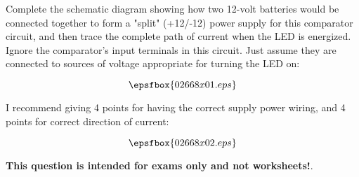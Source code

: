 

Complete the schematic diagram showing how two 12-volt batteries would be connected together to form a "split" (+12/-12) power supply for this comparator circuit, and then trace the complete path of current when the LED is energized.  Ignore the comparator's input terminals in this circuit.  Just assume they are connected to sources of voltage appropriate for turning the LED on:

\vskip 30pt

$$\epsfbox{02668x01.eps}$$







I recommend giving 4 points for having the correct supply power wiring, and 4 points for correct direction of current:

$$\epsfbox{02668x02.eps}$$







{\bf This question is intended for exams only and not worksheets!}.




